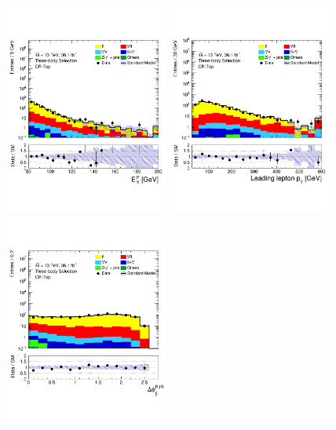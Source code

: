 \begin{figure}[!htb]
    \begin{center}
        \includegraphics[width=0.48\textwidth]{figures/search_stop2l/bkg_est/crtop/crt_MDR}
        \includegraphics[width=0.48\textwidth]{figures/search_stop2l/bkg_est/crtop/crt_l_pt0}
        \includegraphics[width=0.48\textwidth]{figures/search_stop2l/bkg_est/crtop/crt_DPB_vSS}

\end{center}
\end{figure}

